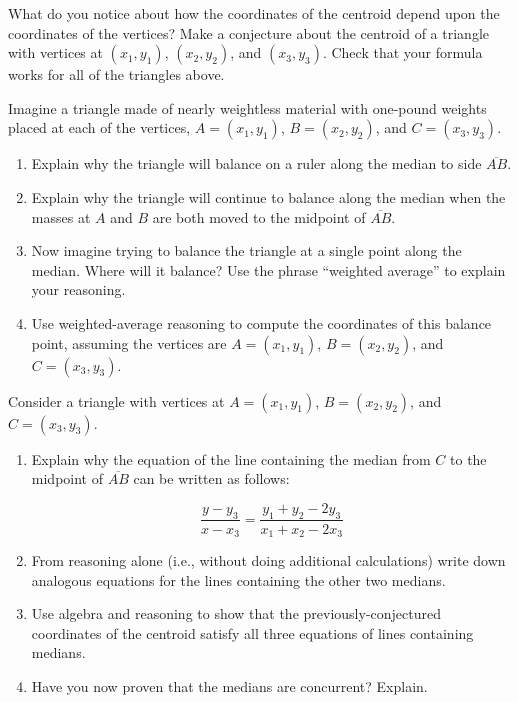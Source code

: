 \begin{prob}
What do you notice about how the coordinates of the centroid depend upon the coordinates of the vertices?  Make a conjecture about the centroid of a triangle with vertices at $(x_1, y_1)$, $(x_2, y_2)$, and $(x_3, y_3)$.  Check that your formula works for all of the triangles above.
\end{prob}

\begin{prob}
Imagine a triangle made of nearly weightless material with one-pound weights placed at each of the vertices, $A=(x_1, y_1)$, $B=(x_2, y_2)$, and $C=(x_3, y_3)$.  
\begin{enumerate}
\item Explain why the triangle will balance on a ruler along the median to side $\overline{AB}$.  
\item Explain why the triangle will continue to balance along the median when the masses at $A$ and $B$ are both moved to the midpoint of $\overline{AB}$.  
\item Now imagine trying to balance the triangle at a single point along the median.  Where will it balance?  Use the phrase ``weighted average'' to explain your reasoning.   
\item Use weighted-average reasoning to compute the coordinates of this balance point, assuming the vertices are $A=(x_1, y_1)$, $B=(x_2, y_2)$, and $C=(x_3, y_3)$.
\end{enumerate}
\end{prob}

\begin{prob}
Consider a triangle with vertices at $A=(x_1, y_1)$, $B=(x_2, y_2)$, and $C=(x_3, y_3)$.  
\begin{enumerate}
\item Explain why the equation of the line containing the median from $C$ to the midpoint of $\overline{AB}$ can be written as follows:  

$$\frac{y-y_3}{x-x_3}=\frac{y_1+y_2-2y_3}{x_1+x_2-2x_3}$$
\item From reasoning alone (i.e., without doing additional calculations) write down analogous equations for the lines containing the other two medians. 
\item Use algebra and reasoning to show that the previously-conjectured coordinates of the centroid satisfy all three equations of lines containing medians.  
\item Have you now proven that the medians are concurrent?  Explain.
\end{enumerate}

\end{prob}

